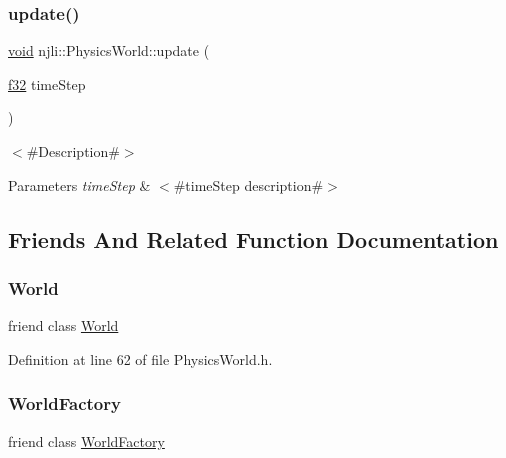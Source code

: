 \subsubsection{\texorpdfstring{update()}{update()}}
{\footnotesize\ttfamily \mbox{\hyperlink{_thread_8h_af1e856da2e658414cb2456cb6f7ebc66}{void}} njli\+::\+Physics\+World\+::update (\begin{DoxyParamCaption}\item[{\mbox{\hyperlink{_util_8h_a5f6906312a689f27d70e9d086649d3fd}{f32}}}]{time\+Step }\end{DoxyParamCaption})}

$<$\#\+Description\#$>$


\begin{DoxyParams}{Parameters}
{\em time\+Step} & $<$\#time\+Step description\#$>$ \\
\hline
\end{DoxyParams}


\subsection{Friends And Related Function Documentation}
\mbox{\label{classnjli_1_1_physics_world_a7b4bcdf992c21ae83363f25df05b1d25}} 
\subsubsection{\texorpdfstring{World}{World}}
{\footnotesize\ttfamily friend class \mbox{\hyperlink{classnjli_1_1_world}{World}}\hspace{0.3cm}{\ttfamily [friend]}}



Definition at line 62 of file Physics\+World.\+h.

\mbox{\label{classnjli_1_1_physics_world_acb96ebb09abe8f2a37a915a842babfac}} 
\subsubsection{\texorpdfstring{World\+Factory}{WorldFactory}}
{\footnotesize\ttfamily friend class \mbox{\hyperlink{classnjli_1_1_world_factory}{World\+Factory}}\hspace{0.3cm}{\ttfamily [friend]}}



